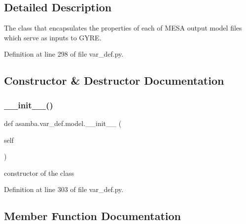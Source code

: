 \subsection{Detailed Description}
\begin{DoxyVerb}The class that encapsulates the properties of each of MESA output model files which serve as inputs
to GYRE.
\end{DoxyVerb}
 

Definition at line 298 of file var\+\_\+def.\+py.



\subsection{Constructor \& Destructor Documentation}
\mbox{\label{classasamba_1_1var__def_1_1model_a6bb4340f0dd97b1311eb7b3e053de0c7}} 
\subsubsection{\texorpdfstring{\+\_\+\+\_\+init\+\_\+\+\_\+()}{\_\_init\_\_()}}
{\footnotesize\ttfamily def asamba.\+var\+\_\+def.\+model.\+\_\+\+\_\+init\+\_\+\+\_\+ (\begin{DoxyParamCaption}\item[{}]{self }\end{DoxyParamCaption})}

\begin{DoxyVerb}constructor of the class
\end{DoxyVerb}
 

Definition at line 303 of file var\+\_\+def.\+py.



\subsection{Member Function Documentation}
\mbox{\label{classasamba_1_1var__def_1_1model_abc39be012825aa3842b694adc8a3b697}} 
